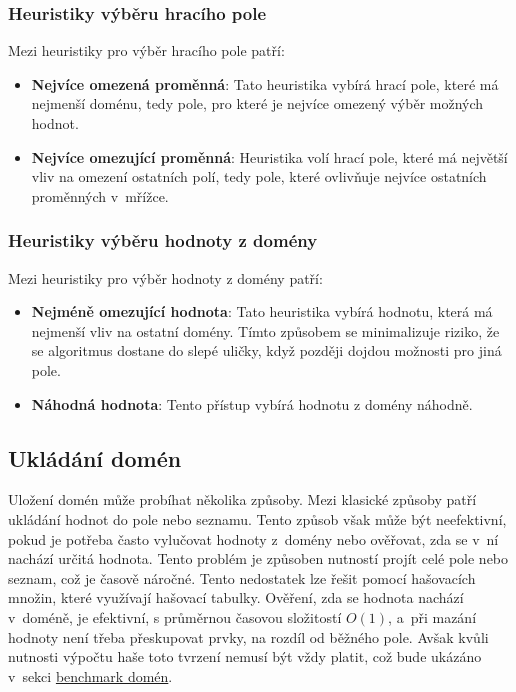 \subsubsection{Heuristiky výběru hracího pole}

Mezi heuristiky pro výběr hracího pole patří:

\begin{itemize}
    \item \textbf{Nejvíce omezená proměnná}: Tato heuristika vybírá hrací pole,
        které má nejmenší doménu, tedy pole, pro které je nejvíce omezený výběr
        možných hodnot.
    \item \textbf{Nejvíce omezující proměnná}: Heuristika volí hrací pole,
        které má největší vliv na omezení ostatních polí, tedy pole, které
        ovlivňuje nejvíce ostatních proměnných v~mřížce.
\end{itemize}

\subsubsection{Heuristiky výběru hodnoty z domény}

Mezi heuristiky pro výběr hodnoty z domény patří:

\begin{itemize}
    \item \textbf{Nejméně omezující hodnota}: Tato heuristika vybírá hodnotu,
        která má nejmenší vliv na ostatní domény. Tímto způsobem se
        minimalizuje riziko, že se algoritmus dostane do slepé uličky, když
        později dojdou možnosti pro jiná pole.
    \item \textbf{Náhodná hodnota}: Tento přístup vybírá hodnotu z domény
        náhodně.
\end{itemize}

\subsection{Ukládání domén}

Uložení domén může probíhat několika způsoby. Mezi klasické způsoby patří
ukládání hodnot do pole nebo seznamu. Tento způsob však může být neefektivní,
pokud je potřeba často vylučovat hodnoty z~domény nebo ověřovat, zda se v~ní
nachází určitá hodnota. Tento problém je způsoben nutností projít celé pole
nebo seznam, což je časově náročné. Tento nedostatek lze řešit pomocí
hašovacích množin, které využívají hašovací tabulky. Ověření, zda se hodnota
nachází v~doméně, je efektivní, s průměrnou časovou složitostí \(O(1)\), a~při
mazání hodnoty není třeba přeskupovat prvky, na rozdíl od běžného pole. Avšak
kvůli nutnosti výpočtu haše toto tvrzení nemusí být vždy platit, což bude
ukázáno v~sekci \hyperref[sec:domain-benchmark]{benchmark domén}.

